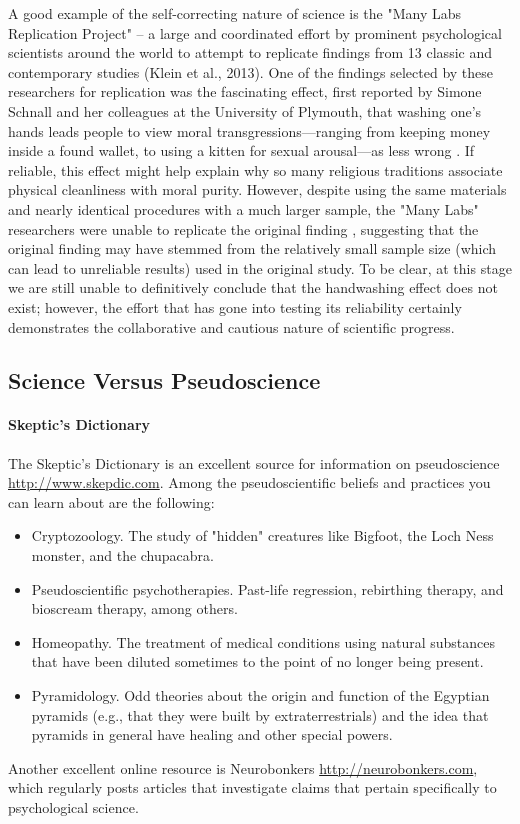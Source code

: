 A good example of the self-correcting nature of science is the "Many Labs Replication Project" -- a large and coordinated effort by prominent psychological scientists around the world to attempt to replicate findings from 13 classic and contemporary studies (Klein et al., 2013). One of the findings selected by these researchers for replication was the fascinating effect, first reported by Simone Schnall and her colleagues at the University of Plymouth, that washing one's hands leads people to view moral transgressions---ranging from keeping money inside a found wallet, to using a kitten for sexual arousal---as less wrong \citep{schnall_clean_2008}. If reliable, this effect might help explain why so many religious traditions associate physical cleanliness with moral purity. However, despite using the same materials and nearly identical procedures with a much larger sample, the "Many Labs" researchers were unable to replicate the original finding \citep{johnson_does_2014}, suggesting that the original finding may have stemmed from the relatively small sample size (which can lead to unreliable results) used in the original study. To be clear, at this stage we are still unable to definitively conclude that the handwashing effect does not exist; however, the effort that has gone into testing its reliability certainly demonstrates the collaborative and cautious nature of scientific progress.


\subsection{Science Versus Pseudoscience}

\paragraph{Skeptic's Dictionary}

The Skeptic's Dictionary is an excellent source for information on pseudoscience \url{http://www.skepdic.com}.
Among the pseudoscientific beliefs and practices you can learn about are the following:
\begin{itemize}
\item Cryptozoology. The study of "hidden" creatures like Bigfoot, the Loch Ness monster, and the chupacabra.
\item Pseudoscientific psychotherapies. Past-life regression, rebirthing therapy, and bioscream therapy, among others.
\item Homeopathy. The treatment of medical conditions using natural substances that have been diluted sometimes to the point of no longer being present.
\item Pyramidology. Odd theories about the origin and function of the Egyptian pyramids (e.g., that they were built by extraterrestrials) and the idea that pyramids in general have healing and other special powers.
\end{itemize}
Another excellent online resource is Neurobonkers \url{http://neurobonkers.com}, which regularly posts articles that investigate claims that pertain specifically to psychological science.


